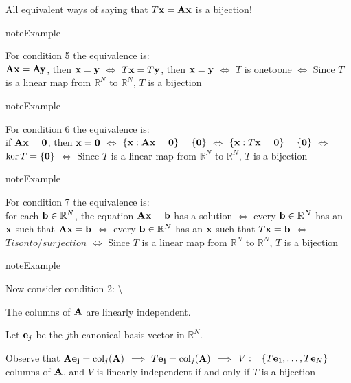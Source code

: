 \documentclass[letterpaper,10pt,english]{jupyterBook}
\begin{document}
\sphinxAtStartPar
All equivalent ways of saying that \(T{\bf x} = {\bf A} {\bf x}\) is a bijection!

\begin{sphinxadmonition}{note}{Example}

\sphinxAtStartPar
For condition 5 the equivalence is: \\
\({\bf A} {\bf x} = {\bf A} {\bf y}\), then \({\bf x} = {\bf y}\)
\(\iff\)
\(T {\bf x} = T {\bf y}\), then \({\bf x} = {\bf y}\)
\(\iff\)
\(T\) is one\sphinxhyphen{}to\sphinxhyphen{}one
\(\iff\)
Since \(T\) is a linear map from \(\mathbb{R}^N\) to \(\mathbb{R}^N\),
\(T\) is a bijection
\end{sphinxadmonition}

\begin{sphinxadmonition}{note}{Example}

\sphinxAtStartPar
For condition 6 the equivalence is: \\
if \({\bf A} {\bf x} = {\bf 0}\), then \({\bf x} = {\bf 0}\)
\(\iff\)
\(\{{\bf x}: {\bf A}{\bf x} = {\bf 0}\} = \{{\bf 0}\}\)
\(\iff\)
\(\{{\bf x}: T{\bf x} = {\bf 0}\} = \{{\bf 0}\}\)
\(\iff\)
\(\ker{T}=\{{\bf 0}\}\)
\(\iff\)
Since \(T\) is a linear map from \(\mathbb{R}^N\) to \(\mathbb{R}^N\),
\(T\) is a bijection
\end{sphinxadmonition}

\begin{sphinxadmonition}{note}{Example}

\sphinxAtStartPar
For condition 7 the equivalence is: \\
for each \({\bf b}\in\mathbb{R}^N\), the equation \({\bf A}{\bf x} = {\bf b}\) has a solution
\(\iff\)
every \({\bf b}\in\mathbb{R}^N\) has an \({\bf x}\) such that \({\bf A}{\bf x} = {\bf b}\)
\(\iff\)
every \({\bf b}\in\mathbb{R}^N\) has an \({\bf x}\) such that \(T{\bf x} = {\bf b}\)
\(\iff\)
\(T is onto/surjection\)
\(\iff\)
Since \(T\) is a linear map from \(\mathbb{R}^N\) to \(\mathbb{R}^N\),
\(T\) is a bijection
\end{sphinxadmonition}

\begin{sphinxadmonition}{note}{Example}

\sphinxAtStartPar
Now consider condition 2: \textbackslash{}

\sphinxAtStartPar
The columns of \({\bf A}\) are linearly independent.

\sphinxAtStartPar
Let \({\bf e}_j\) be the \(j\)\sphinxhyphen{}th canonical basis vector in \(\mathbb{R}^N\).

\sphinxAtStartPar
Observe that \({\bf A}{\bf e_j} = \mathrm{col}_j({\bf A})\)
\(\implies\)
\(T{\bf e_j} = \mathrm{col}_j({\bf A})\)
\(\implies\)
\(V := \{T {\bf e}_1, \ldots, T{\bf e}_N\}
=\) columns of \({\bf A}\), and \(V\) is linearly independent if and only if \(T\) is a bijection
\end{sphinxadmonition}
\end{document}

